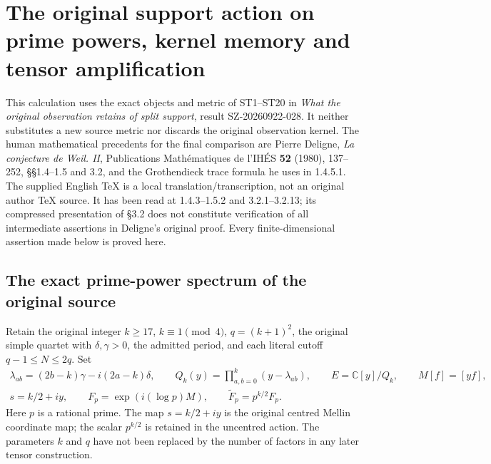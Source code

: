 \documentclass[11pt]{article}
\begin{document}
\section{The original support action on prime powers, kernel memory and tensor amplification}
\label{sec:tau-prime-memory}

This calculation uses the exact objects and metric of ST1--ST20 in
\emph{What the original observation retains of split support}, result
SZ-20260922-028. It neither substitutes a new source metric nor discards
the original observation kernel. The human mathematical precedents for
the final comparison are Pierre Deligne, \emph{La conjecture de Weil. II},
Publications Math\'ematiques de l'IH\'ES \textbf{52} (1980), 137--252,
\S\S1.4--1.5 and 3.2, and the Grothendieck trace formula he uses in
1.4.5.1. The supplied English TeX is a local translation/transcription,
not an original author TeX source. It has been read at 1.4.3--1.5.2 and
3.2.1--3.2.13; its compressed presentation of \S3.2 does not constitute
verification of all intermediate assertions in Deligne's original proof.
Every finite-dimensional assertion made below is proved here.

\subsection{The exact prime-power spectrum of the original source}

Retain the original integer $k\ge17$, $k\equiv1\pmod4$, $q=(k+1)^2$,
the original simple quartet with $\delta,\gamma>0$, the admitted period,
and each literal cutoff $q-1\le N\le2q$. Set
\begin{equation}\tag{TDP1}
\begin{gathered}
\lambda_{ab}=(2b-k)\gamma-i(2a-k)\delta,\qquad
Q_k(y)=\prod_{a,b=0}^k(y-\lambda_{ab}),\qquad
E=\mathbb C[y]/Q_k,\qquad M[f]=[yf],\\
s=k/2+iy,\qquad
F_p=\exp(i(\log p)M),\qquad
\widetilde F_p=p^{k/2}F_p .
\end{gathered}
\end{equation}
Here $p$ is a rational prime. The map $s=k/2+iy$ is the original
centred Mellin coordinate map; the scalar $p^{k/2}$ is retained in the
uncentred action. The parameters $k$ and $q$ have not been replaced by
the number of factors in any later tensor construction.
\end{document}
